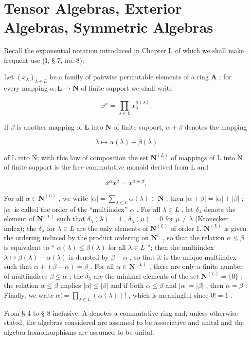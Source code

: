 \chapter{Tensor Algebras, Exterior Algebras, Symmetric Algebras}

Recall the exponential notation introduced in Chapter I, of which we shall make frequent use (I, § 7, no. 8):

Let \((x_{\lambda})_{\lambda \in L}\) be a family of pairwise permutable elements of a ring \(\mathbf{A}\) ; for every mapping \(\alpha: \mathbf{L} \to \mathbf{N}\) of finite support we shall write

\[
x ^ {\alpha} = \prod_ {\lambda \in L} x _ {\lambda} ^ {\alpha (\lambda)}.
\]

If \(\beta\) is another mapping of \(\mathbf{L}\) into \(\mathbf{N}\) of finite support, \(\alpha + \beta\) denotes the mapping

\[
\lambda \mapsto \alpha (\lambda) + \beta (\lambda)
\]

of L into N; with this law of composition the set \(\mathbf{N}^{(L)}\) of mappings of L into N of finite support is the free commutative monoid derived from L and

\[
x ^ {\alpha} x ^ {\beta} = x ^ {\alpha + \beta},
\]

For all \(\alpha \in \mathbf{N}^{(L)}\) , we write \(|\alpha| = \sum_{\lambda \in L} \alpha(\lambda) \in \mathbf{N}\) ; then \(|\alpha + \beta| = |\alpha| + |\beta|\) ; \(|\alpha|\) is called the order of the ``multiindex'' \(\alpha\) . For all \(\lambda \in L\) , let \(\delta_{\lambda}\) denote the element of \(\mathbf{N}^{(L)}\) such that \(\delta_{\lambda}(\lambda) = 1\) , \(\delta_{\lambda}(\mu) = 0\) for \(\mu \neq \lambda\) (Kronecker index); the \(\delta_{\lambda}\) for \(\lambda \in L\) are the only elements of \(\mathbf{N}^{(L)}\) of order 1. \(\mathbf{N}^{(L)}\) is given the ordering induced by the product ordering on \(\mathbf{N}^{\mathrm{L}}\) , so that the relation \(\alpha \leqslant \beta\) is equivalent to `` \(\alpha(\lambda) \leqslant \beta(\lambda)\) for all \(\lambda \in L\) ''; then the multiindex \(\lambda \mapsto \beta(\lambda) - \alpha(\lambda)\) is denoted by \(\beta - \alpha\) , so that it is the unique multiindex such that \(\alpha + (\beta - \alpha) = \beta\) . For all \(\alpha \in \mathbf{N}^{(L)}\) , there are only a finite number of multiindices \(\beta \leqslant \alpha\) ; the \(\delta_{\lambda}\) are the minimal elements of the set \(\mathbf{N}^{(L)} = \{0\}\) ; the relation \(\alpha \leqslant \beta\) implies \(|\alpha| \leqslant |\beta|\) and if both \(\alpha \leqslant \beta\) and \(|\alpha| = |\beta|\) , then \(\alpha = \beta\) . Finally, we write \(\alpha! = \prod_{\lambda \in L} (\alpha(\lambda))!\) , which is meaningful since \(0! = 1\) .

From § 4 to § 8 inclusive, A denotes a commutative ring and, unless otherwise stated, the algebras considered are assumed to be associative and unital and the algebra homomorphisms are assumed to be unital.

